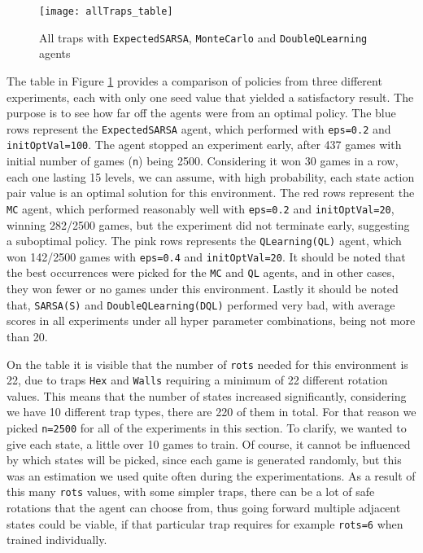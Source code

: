 \begin{figure}[h]
    \centering
    \texttt{[image: allTraps\_table]}
    \caption{All traps with \texttt{ExpectedSARSA}, \texttt{MonteCarlo} and \texttt{DoubleQLearning} agents}
    \label{fig:traps_table_eg}
\end{figure}


The table in Figure \ref{fig:traps_table_eg} provides a comparison of policies from three different experiments, each with only one seed value that yielded a satisfactory result. The purpose is to see how far off the agents were from an optimal policy. The blue rows represent the \texttt{ExpectedSARSA} agent, which performed with \texttt{eps=0.2} and \texttt{initOptVal=100}. The agent stopped an experiment early, after 437 games with initial number of games (\texttt{n}) being 2500. Considering it won 30 games in a row, each one lasting 15 levels, we can assume, with high probability, each state action pair value is an optimal solution for this environment. The red rows represent the \texttt{MC} agent, which performed reasonably well with \texttt{eps=0.2} and \texttt{initOptVal=20}, winning 282/2500 games, but the experiment did not terminate early, suggesting a suboptimal policy. The pink rows represents the \texttt{QLearning(QL)} agent, which won 142/2500 games with \texttt{eps=0.4} and \texttt{initOptVal=20}. It should be noted that the best occurrences were picked for the \texttt{MC} and \texttt{QL} agents, and in other cases, they won fewer or no games under this environment. Lastly it should be noted that, \texttt{SARSA(S)} and \texttt{DoubleQLearning(DQL)}  performed very bad, with average scores in all experiments under all hyper parameter combinations, being not more than 20.

On the table it is visible that the number of \texttt{rots} needed for this environment is 22, due to traps \texttt{Hex} and \texttt{Walls} requiring a minimum of 22 different rotation values. This means that the number of states increased significantly, considering we have 10 different trap types, there are 220 of them in total. For that reason we picked \texttt{n=2500} for all of the experiments in this section. To clarify, we wanted to give each state, a little over 10 games to train. Of course, it cannot be influenced by which states will be picked, since each game is generated randomly, but this was an estimation we used quite often during the experimentations. As a result of this many \texttt{rots} values, with some simpler traps, there can be a lot of safe  rotations that the agent can choose from, thus going forward multiple adjacent states could be viable, if that particular trap requires for example \texttt{rots=6} when trained individually.

